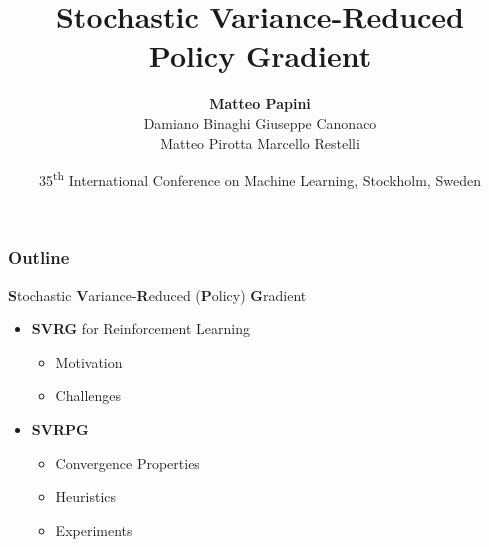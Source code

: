 \documentclass[aspectratio=169]{beamer}
\title{Stochastic Variance-Reduced Policy Gradient}
\date[ICML 2018]{\small{35\textsuperscript{th} International Conference on Machine Learning, Stockholm, Sweden}}
\author[Papini et al.]{\textbf{Matteo Papini} \\
						\small{Damiano Binaghi \quad Giuseppe Canonaco \\
								Matteo Pirotta \quad Marcello Restelli}}
\newcommand{\enb}[1]{\textcolor{poliblue1}{\textbf{#1}}}
\newcommand{\soft}[1]{\textcolor{softblue}{#1}}
\begin{document}

\begin{frame}
\titlepage
\end{frame}

\begin{frame} 
\frametitle{Outline} 
\begin{center}
	\Large{\enb{S}\soft{tochastic}
		\enb{V}\soft{ariance-}}\enb{R}\soft{educed}
	\soft{(}\enb{P}\soft{olicy}\soft{)}
	\enb{G}\soft{radient}
\end{center}


\begin{itemize}
	\item \enb{SVRG} for Reinforcement Learning
		\begin{itemize}
		\item Motivation
		\item Challenges
	\end{itemize}
	\item \enb{SVRPG}
	\begin{itemize}
		\item Convergence Properties
		\item Heuristics
		\item Experiments
	\end{itemize}
\end{itemize}

\end{frame}
\end{document}
